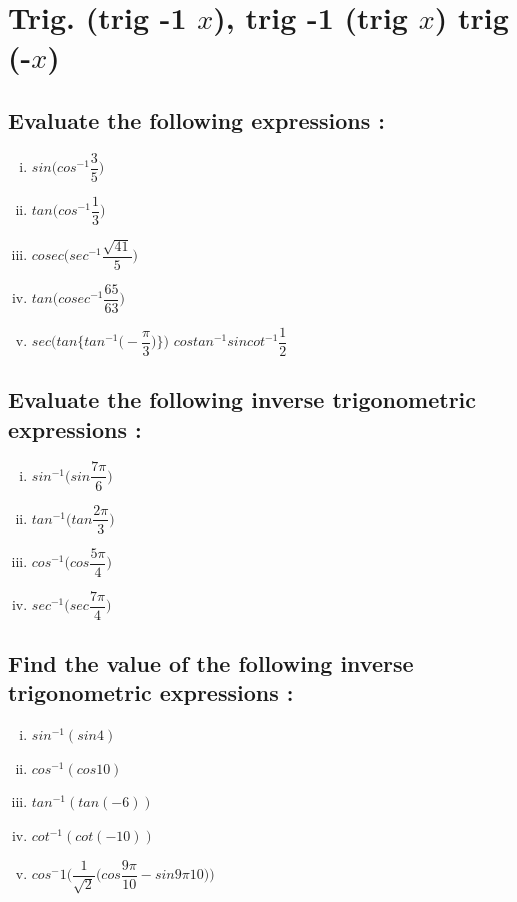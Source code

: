 \documentclass[a4paper,10pt]{article}
\begin{document}
\section{Trig. (trig -1 $x$), trig -1 (trig $x$) trig (-$x$)}
\subsection{Evaluate the following expressions :}
\begin{multicols}{2}
\begin{enumerate}[(i)]
\item $sin\bigg(cos^{-1}\dfrac{3}{5}\bigg)$
\item $tan\bigg(cos^{-1}\dfrac{1}{3}\bigg)$
\item $cosec\bigg(sec^{-1}\dfrac{\sqrt{41}}{5}\bigg)$
\item $tan\bigg(cosec^{-1}\dfrac{65}{63}\bigg)$
\item
$sec\bigg(tan\bigg\{tan^{-1}\bigg(-\dfrac{\pi}{3}\bigg)\bigg\}\bigg)$
$cos tan^{-1} {sin} cot^{-1}\dfrac{1}{2}$
\end{enumerate}
\end{multicols}
\subsection{Evaluate the following inverse trigonometric expressions :}
\begin{multicols}{2}  
\begin{enumerate}[(i)] 
\item $sin^{-1}\bigg(sin\dfrac{7\pi}{6}\bigg)$
\item $tan^{-1}\bigg(tan\dfrac{2\pi}{3}\bigg)$
\item $cos^{-1}\bigg(cos\dfrac{5\pi}{4}\bigg)$
\item $sec^{-1}\bigg(sec\dfrac{7\pi}{4}\bigg)$
\end{enumerate}
\end{multicols}
\subsection{Find the value of the following inverse trigonometric
expressions :}
\begin{multicols}{2}     
\begin{enumerate}[(i)] 
\item $sin^{-1}(sin 4)$
\item $cos^{-1}(cos 10)$
\item $tan^{-1}(tan (-6))$
\item $cot^{-1}(cot(-10))$
\item
$cos^-1\bigg(\dfrac{1}{\sqrt{2}}\bigg(cos\dfrac{9\pi}{10}-sin{9\pi}{10}\bigg)\bigg)$
\end{enumerate}
\end{multicols}
\end{document}
